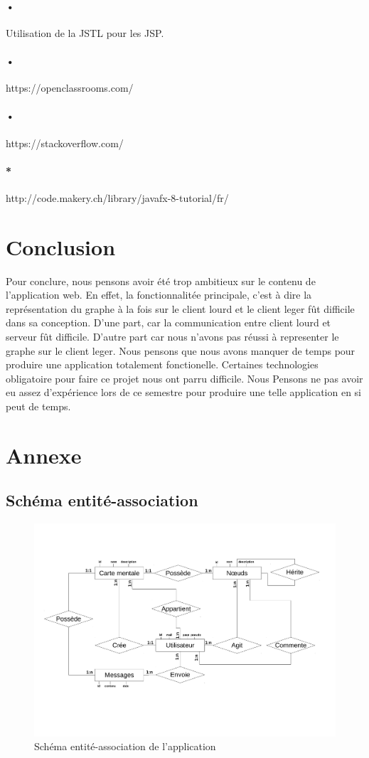 \documentclass[11pt,a4paper]{article}
\begin{document}
\paragraph{•} Utilisation de la JSTL pour les JSP.
\paragraph{•} https://openclassrooms.com/
\paragraph{•} https://stackoverflow.com/
\paragraph{*} http://code.makery.ch/library/javafx-8-tutorial/fr/

\section{Conclusion}
Pour conclure, nous pensons avoir été trop ambitieux sur le contenu de
l'application web. En effet, la fonctionnalitée principale, c'est à
dire la représentation du graphe à la fois sur le client lourd et le client
leger fût difficile dans sa conception. D'une part, car la communication
entre client lourd et serveur fût difficile. D'autre part car nous
n'avons pas réussi à representer le graphe sur le client leger. Nous
pensons que nous avons manquer de temps pour produire une application
totalement fonctionelle. Certaines technologies obligatoire pour faire
ce projet nous ont parru difficile. Nous Pensons ne pas avoir eu assez
d'expérience lors de ce semestre pour produire une telle application
en si peut de temps.  


\newpage
\section{Annexe}
\subsection{Schéma entité-association}
\begin{figure}[!h]
\includegraphics[angle=270, scale=0.6]{Image/Schema_entite_association.pdf}
\caption{Schéma entité-association de l'application}
\end{figure}
\newpage
\end{document}
